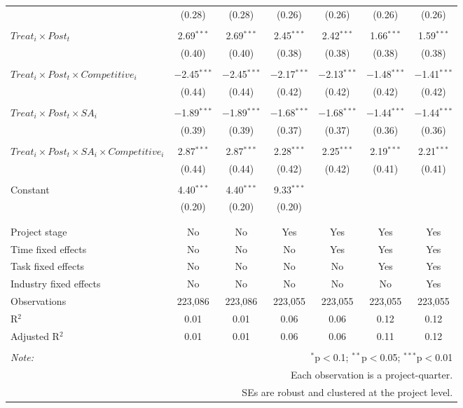 \documentclass[
]{article}
\begin{document}
\begin{table}[H]
\begin{tabular}{@{\extracolsep{-3pt}}lcccccc}
  & (0.28) & (0.28) & (0.26) & (0.26) & (0.26) & (0.26) \\ 
  & & & & & & \\ 
 $Treat_i \times Post_t$ & 2.69$^{***}$ & 2.69$^{***}$ & 2.45$^{***}$ & 2.42$^{***}$ & 1.66$^{***}$ & 1.59$^{***}$ \\ 
  & (0.40) & (0.40) & (0.38) & (0.38) & (0.38) & (0.38) \\ 
  & & & & & & \\ 
 $Treat_i \times Post_t \times Competitive_i$ & $-$2.45$^{***}$ & $-$2.45$^{***}$ & $-$2.17$^{***}$ & $-$2.13$^{***}$ & $-$1.48$^{***}$ & $-$1.41$^{***}$ \\ 
  & (0.44) & (0.44) & (0.42) & (0.42) & (0.42) & (0.42) \\ 
  & & & & & & \\ 
 $Treat_i \times Post_t \times SA_i$ & $-$1.89$^{***}$ & $-$1.89$^{***}$ & $-$1.68$^{***}$ & $-$1.68$^{***}$ & $-$1.44$^{***}$ & $-$1.44$^{***}$ \\ 
  & (0.39) & (0.39) & (0.37) & (0.37) & (0.36) & (0.36) \\ 
  & & & & & & \\ 
 $Treat_i \times Post_t \times SA_i \times Competitive_i$ & 2.87$^{***}$ & 2.87$^{***}$ & 2.28$^{***}$ & 2.25$^{***}$ & 2.19$^{***}$ & 2.21$^{***}$ \\ 
  & (0.44) & (0.44) & (0.42) & (0.42) & (0.41) & (0.41) \\ 
  & & & & & & \\ 
 Constant & 4.40$^{***}$ & 4.40$^{***}$ & 9.33$^{***}$ &  &  &  \\ 
  & (0.20) & (0.20) & (0.20) &  &  &  \\ 
  & & & & & & \\ 
\hline \\[-1.8ex] 
Project stage & No & No & Yes & Yes & Yes & Yes \\ 
Time fixed effects & No & No & No & Yes & Yes & Yes \\ 
Task fixed effects & No & No & No & No & Yes & Yes \\ 
Industry fixed effects & No & No & No & No & No & Yes \\ 
Observations & 223,086 & 223,086 & 223,055 & 223,055 & 223,055 & 223,055 \\ 
R$^{2}$ & 0.01 & 0.01 & 0.06 & 0.06 & 0.12 & 0.12 \\ 
Adjusted R$^{2}$ & 0.01 & 0.01 & 0.06 & 0.06 & 0.11 & 0.12 \\ 
\hline 
\hline \\[-1.8ex] 
\textit{Note:}  & \multicolumn{6}{r}{$^{*}$p$<$0.1; $^{**}$p$<$0.05; $^{***}$p$<$0.01} \\ 
 & \multicolumn{6}{r}{Each observation is a project-quarter.} \\ 
 & \multicolumn{6}{r}{SEs are robust and clustered at the project level.} \\ 
\end{tabular} 
\end{table}
\end{document}
